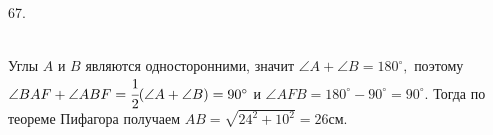 67. \begin{figure}[ht!]
\end{figure}\\
Углы $A$ и $B$ являются односторонними, значит $\angle A+\angle B=180^\circ,$ поэтому $\angle BAF+\angle ABF=\cfrac{1}{2}(\angle A+\angle B)=90^\circ$ и $\angle AFB=180^\circ-90^\circ=90^\circ.$ Тогда по теореме Пифагора получаем $AB=\sqrt{24^2+10^2}=26$см.\newpage\noindent
